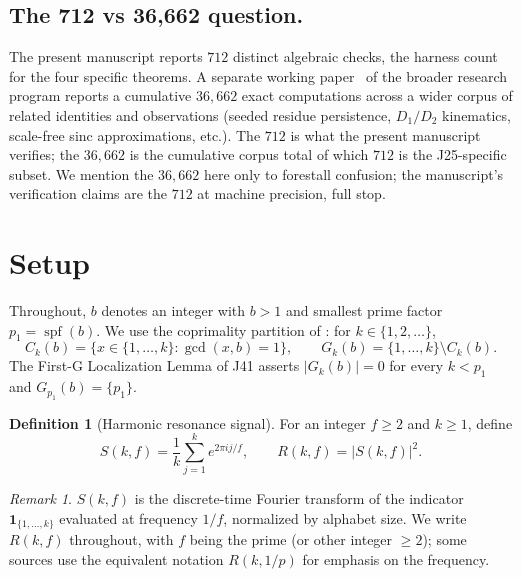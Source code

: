 \documentclass[11pt,reqno]{amsart}
\theoremstyle{plain}
\theoremstyle{definition}
\newtheorem{definition}[theorem]{Definition}
\theoremstyle{remark}
\newtheorem{remark}[theorem]{Remark}
\DeclareMathOperator{\spf}{spf}
\begin{document}
\subsection*{The 712 vs 36{,}662 question.}

The present manuscript reports $712$ distinct algebraic checks,
the harness count for the four specific theorems. A separate
working paper~\cite{Sanders2026WP35} of the broader research
program reports a cumulative $36{,}662$ exact computations
across a wider corpus of related identities and observations
(seeded residue persistence, $D_1/D_2$ kinematics, scale-free
sinc approximations, etc.). The $712$ is what the present
manuscript verifies; the $36{,}662$ is the cumulative corpus
total of which $712$ is the J25-specific subset. We mention the
$36{,}662$ here only to forestall confusion; the manuscript's
verification claims are the $712$ at machine precision, full
stop.

\section{Setup}
\label{sec:setup}

Throughout, $b$ denotes an integer with $b > 1$ and smallest prime
factor $p_1 = \spf(b)$. We use the coprimality partition of
\cite{J04Sanders}: for $k \in \{1, 2, \ldots\}$,
\[
  C_k(b) = \{ x \in \{1, \ldots, k\} : \gcd(x, b) = 1 \},
  \qquad
  G_k(b) = \{1, \ldots, k\} \setminus C_k(b).
\]
The First-G Localization Lemma of J41 \cite[Theorem~3.1]{J04Sanders}
asserts $|G_k(b)| = 0$ for every $k < p_1$ and
$G_{p_1}(b) = \{p_1\}$.

\begin{definition}[Harmonic resonance signal]
\label{def:R}
For an integer $f \ge 2$ and $k \ge 1$, define
\begin{equation}
  S(k, f) = \frac{1}{k} \sum_{j=1}^{k} e^{2\pi i j / f},
  \qquad
  R(k, f) = |S(k, f)|^2.
  \label{eq:RSdef}
\end{equation}
\end{definition}

\begin{remark}
$S(k, f)$ is the discrete-time Fourier transform of the indicator
$\mathbf{1}_{\{1, \ldots, k\}}$ evaluated at frequency $1/f$,
normalized by alphabet size. We write $R(k, f)$ throughout, with
$f$ being the prime (or other integer $\ge 2$); some sources use
the equivalent notation $R(k, 1/p)$ for emphasis on the frequency.
\end{remark}
\end{document}
